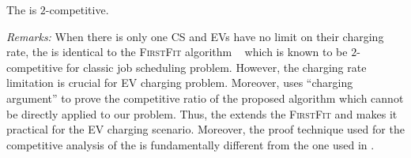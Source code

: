 \begin{thm}
	\label{thm:focscompetitive}
	The \focs is $2$-competitive.
\end{thm}



\emph{Remarks:} When there is only one CS and EVs have no limit on their charging rate, the \focs is identical to the \textsc{FirstFit} algorithm ~\cite{firstfit} which is known to be $2$-competitive for classic job scheduling problem. However, the charging rate limitation is crucial for EV charging problem. Moreover, \cite{firstfit} uses  ``charging argument'' to prove the competitive ratio of the proposed algorithm which cannot be directly applied to our problem. Thus, the \focs extends the \textsc{FirstFit} and makes it practical for the EV charging scenario. Moreover, the proof technique used for the competitive analysis of the \focs is fundamentally different from the one used in \cite{firstfit}. 

%
